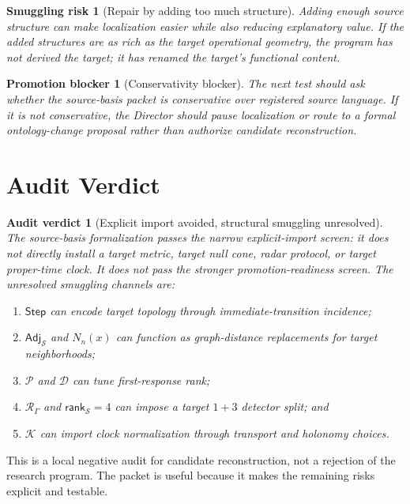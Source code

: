 \documentclass[11pt]{article}
\newcommand{\Step}{\mathsf{Step}}
\newcommand{\Adj}{\mathsf{Adj}_{\mathcal{S}}}
\newcommand{\RespAlg}{\mathcal{R}_{\Gamma}}
\newcommand{\Rank}{\mathsf{rank}_{\mathcal{S}}}
\newtheorem{smugglingrisk}{Smuggling risk}
\newtheorem{promotionblocker}{Promotion blocker}
\newtheorem{auditverdict}{Audit verdict}
\begin{document}
\begin{smugglingrisk}[Repair by adding too much structure]
Adding enough source structure can make localization easier while also
reducing explanatory value. If the added structures are as rich as the target
operational geometry, the program has not derived the target; it has renamed
the target's functional content.
\end{smugglingrisk}

\begin{promotionblocker}[Conservativity blocker]
The next test should ask whether the source-basis packet is conservative over
registered source language. If it is not conservative, the Director should
pause localization or route to a formal ontology-change proposal rather than
authorize candidate reconstruction.
\end{promotionblocker}

\section{Audit Verdict}

\begin{auditverdict}[Explicit import avoided, structural smuggling unresolved]
The source-basis formalization passes the narrow explicit-import screen: it
does not directly install a target metric, target null cone, radar protocol,
or target proper-time clock. It does not pass the stronger promotion-readiness
screen. The unresolved smuggling channels are:
\begin{enumerate}
    \item \(\Step\) can encode target topology through immediate-transition
    incidence;
    \item \(\Adj\) and \(N_n(x)\) can function as graph-distance replacements
    for target neighborhoods;
    \item \(\mathcal{P}\) and \(\mathcal{D}\) can tune first-response rank;
    \item \(\RespAlg\) and \(\Rank=4\) can impose a target \(1+3\) detector
    split; and
    \item \(\mathcal{K}\) can import clock normalization through transport
    and holonomy choices.
\end{enumerate}
\end{auditverdict}

This is a local negative audit for candidate reconstruction, not a rejection
of the research program. The packet is useful because it makes the remaining
risks explicit and testable.
\end{document}
